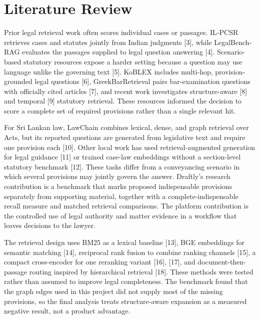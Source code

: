 \documentclass[12pt,a4paper]{article}
\begin{document}
\section{Literature Review}

Prior legal retrieval work often scores individual cases or passages. IL-PCSR retrieves cases and statutes jointly from Indian judgments [3], while LegalBench-RAG evaluates the passages supplied to legal question answering [4]. Scenario-based statutory resources expose a harder setting because a question may use language unlike the governing text [5]. KoBLEX includes multi-hop, provision-grounded legal questions [6], GreekBarRetrieval pairs bar-examination questions with officially cited articles [7], and recent work investigates structure-aware [8] and temporal [9] statutory retrieval. These resources informed the decision to score a complete set of required provisions rather than a single relevant hit.


For Sri Lankan law, LawChain combines lexical, dense, and graph retrieval over Acts, but its reported questions are generated from legislative text and require one provision each [10]. Other local work has used retrieval-augmented generation for legal guidance [11] or trained case-law embeddings without a section-level statutory benchmark [12]. These tasks differ from a conveyancing scenario in which several provisions may jointly govern the answer. Draftly's research contribution is a benchmark that marks proposed indispensable provisions separately from supporting material, together with a complete-indispensable recall measure and matched retrieval comparisons. The platform contribution is the controlled use of legal authority and matter evidence in a workflow that leaves decisions to the lawyer.


The retrieval design uses BM25 as a lexical baseline [13], BGE embeddings for semantic matching [14], reciprocal rank fusion to combine ranking channels [15], a compact cross-encoder for one reranking variant [16], [17], and document-then-passage routing inspired by hierarchical retrieval [18]. These methods were tested rather than assumed to improve legal completeness. The benchmark found that the graph edges used in this project did not supply most of the missing provisions, so the final analysis treats structure-aware expansion as a measured negative result, not a product advantage.
\end{document}
